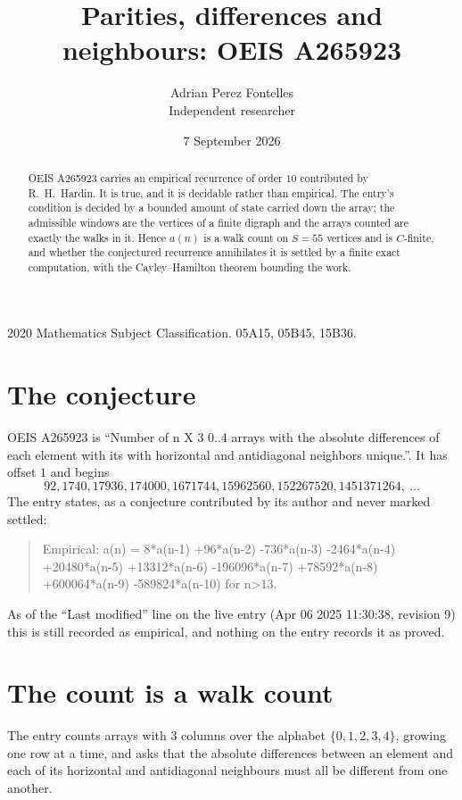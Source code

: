 \documentclass[11pt,a4paper]{article}
\title{Parities, differences and neighbours: OEIS A265923}
\author{Adrian Perez Fontelles\\ \small Independent researcher}
\date{7 September 2026}
\theoremstyle{plain}
\theoremstyle{definition}
\begin{document}
\maketitle

\begin{abstract}
OEIS A265923 carries an empirical recurrence of order $10$ contributed by R.~H.~Hardin. It is
true, and it is decidable rather than empirical. The entry's condition is decided by a bounded amount of state carried down the array; the
admissible windows are the vertices of a finite digraph and the arrays counted are exactly the
walks in it. Hence $a(n)$ is a walk count on $S=55$ vertices and is $C$-finite, and whether the
conjectured recurrence annihilates it is settled by a finite exact computation, with the
Cayley--Hamilton theorem bounding the work.
\end{abstract}

\noindent\small 2020 Mathematics Subject Classification. 05A15, 05B45, 15B36.\normalsize

\section{The conjecture}

OEIS A265923 is ``Number of n X 3 0..4 arrays with the absolute differences of each element with its with horizontal and antidiagonal neighbors unique.''. It has offset $1$ and begins
\[
92, 1740, 17936, 174000, 1671744, 15962560, 152267520, 1451371264,\ \dots
\]
The entry states, as a conjecture contributed by its author and never marked settled:
\begin{quote}
Empirical: a(n) = 8*a(n-1) +96*a(n-2) -736*a(n-3) -2464*a(n-4) +20480*a(n-5) +13312*a(n-6) -196096*a(n-7) +78592*a(n-8) +600064*a(n-9) -589824*a(n-10) for n>13.
\end{quote}
As of the ``Last modified'' line on the live entry (Apr 06 2025 11:30:38, revision 9) this is still
recorded as empirical, and nothing on the entry records it as proved.

\section{The count is a walk count}

The entry counts arrays with $3$ columns over the alphabet $\{0,1,2,3,4\}$, growing one row at a time, and asks that the absolute differences between an element and each of its horizontal and antidiagonal neighbours must all be different from one another.
\end{document}

